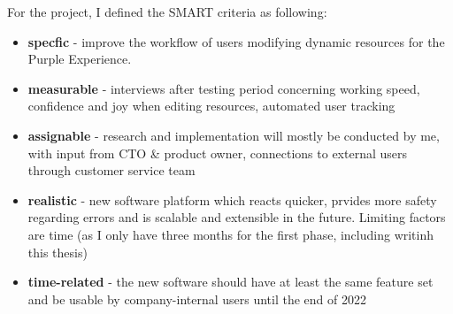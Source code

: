 For the project, I defined the SMART criteria as following:

\begin{itemize}
  \item \textbf{specfic} - improve the workflow of users modifying dynamic resources for the Purple Experience.
  \item \textbf{measurable} - interviews after testing period concerning working speed, confidence and joy when editing resources, automated user tracking
  \item \textbf{assignable} - research and implementation will mostly be conducted by me, with input from CTO \& product owner, connections to external users through customer service team
  \item \textbf{realistic} - new software platform which reacts quicker, prvides more safety regarding errors and is scalable and extensible in the future. Limiting factors are time (as I only have three months for the first phase, including writinh this thesis)
  \item \textbf{time-related} - the new software should have at least the same feature set and be usable by company-internal users until the end of 2022
\end{itemize}

